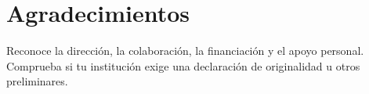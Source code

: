 \section*{Agradecimientos}
Reconoce la dirección, la colaboración, la financiación y el apoyo personal.
Comprueba si tu institución exige una declaración de originalidad u otros preliminares.
